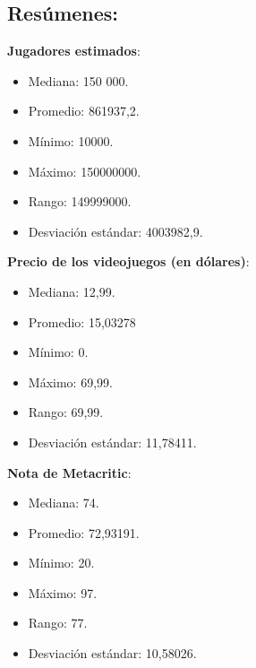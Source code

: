 \documentclass[
  letterpaper,
  DIV=11,
  numbers=noendperiod]{scrreprt}
\begin{document}
\hypertarget{resuxfamenes}{%
\subsection{Resúmenes:}\label{resuxfamenes}}

\begin{tcolorbox}[enhanced jigsaw, rightrule=.15mm, colframe=quarto-callout-color-frame, opacityback=0, leftrule=.75mm, bottomrule=.15mm, arc=.35mm, toprule=.15mm, left=2mm, breakable, colback=white]

\textbf{Jugadores estimados}:

\begin{itemize}
\item
  Mediana: 150 000.
\item
  Promedio: 861937,2.
\item
  Mínimo: 10000.
\item
  Máximo: 150000000.
\item
  Rango: 149999000.
\item
  Desviación estándar: 4003982,9.
\end{itemize}

\end{tcolorbox}

\begin{tcolorbox}[enhanced jigsaw, rightrule=.15mm, colframe=quarto-callout-color-frame, opacityback=0, leftrule=.75mm, bottomrule=.15mm, arc=.35mm, toprule=.15mm, left=2mm, breakable, colback=white]

\textbf{Precio de los videojuegos (en dólares)}:

\begin{itemize}
\item
  Mediana: 12,99.
\item
  Promedio: 15,03278
\item
  Mínimo: 0.
\item
  Máximo: 69,99.
\item
  Rango: 69,99.
\item
  Desviación estándar: 11,78411.
\end{itemize}

\end{tcolorbox}

\begin{tcolorbox}[enhanced jigsaw, rightrule=.15mm, colframe=quarto-callout-color-frame, opacityback=0, leftrule=.75mm, bottomrule=.15mm, arc=.35mm, toprule=.15mm, left=2mm, breakable, colback=white]

\textbf{Nota de Metacritic}:

\begin{itemize}
\item
  Mediana: 74.
\item
  Promedio: 72,93191.
\item
  Mínimo: 20.
\item
  Máximo: 97.
\item
  Rango: 77.
\item
  Desviación estándar: 10,58026.
\end{itemize}

\end{tcolorbox}
\end{document}
